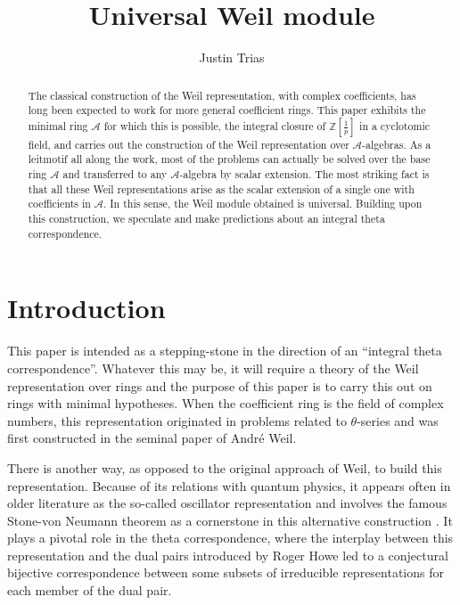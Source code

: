 \documentclass[11pt]{article}
\title{Universal Weil module}
\author{Justin Trias}
\date{}
\theoremstyle{plain}
\theoremstyle{definition}
\theoremstyle{plain}
\theoremstyle{definition}
\theoremstyle{plain}
\begin{document}
\maketitle

\begin{abstract} The classical construction of the Weil representation, with complex coefficients, has long been expected to work for more general coefficient rings. This paper exhibits the minimal ring $\mathcal{A}$ for which this is possible, the integral closure of $\mathbb{Z}[\frac{1}{p}]$ in a cyclotomic field, and carries out the construction of the Weil representation over $\mathcal{A}$-algebras. As a leitmotif all along the work, most of the problems can actually be solved over the base ring $\mathcal{A}$ and transferred to any $\mathcal{A}$-algebra by scalar extension. The most striking fact is that all these Weil representations arise as the scalar extension of a single one with coefficients in $\mathcal{A}$. In this sense, the Weil module obtained is universal. Building upon this construction, we speculate and make predictions about an integral theta correspondence. \end{abstract}

\section*{Introduction}

This paper is intended as a stepping-stone in the direction of an ``integral theta correspondence''. Whatever this may be, it will require a theory of the Weil representation over rings and the purpose of this paper is to carry this out on rings with minimal hypotheses. When the coefficient ring is the field of complex numbers, this representation originated in problems related to $\theta$-series and was first constructed in the seminal paper \cite{weil_article} of André Weil. 

There is another way, as opposed to the original approach of Weil, to build this representation. Because of its relations with quantum physics, it appears often in older literature as the so-called oscillator representation and involves the famous Stone-von Neumann theorem as a cornerstone in this alternative construction \cite{howe}. It plays a pivotal role in the theta correspondence, where the interplay between this representation and the dual pairs introduced by Roger Howe \cite{howe} led to a conjectural bijective correspondence between some subsets of irreducible representations for each member of the dual pair. 
\end{document}
